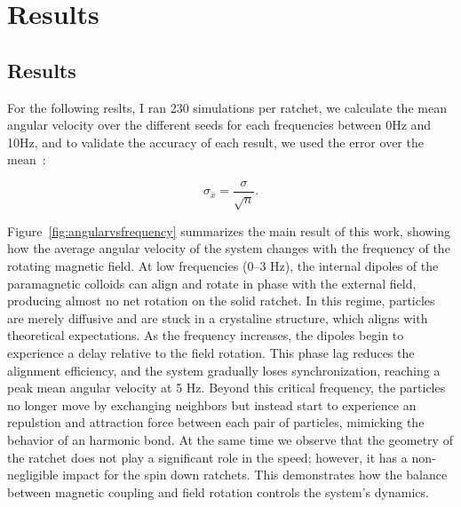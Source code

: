 \part{Results}
\label{part:results}

\chapter{Results}

For the following reslts, I ran 230 simulations per ratchet, we calculate the mean angular velocity over the different seeds for each frequencies between 0Hz and 10Hz, and to validate the accuracy of each result, we used the error over the mean~\cite{altman2005standard}:

\begin{equation}
  \sigma_{\bar{x}} = \displaystyle\frac{\sigma}{\sqrt{n}}.
  \label{eq:errormean}
\end{equation}

Figure~\ref{fig:angularvsfrequency} summarizes the main result of this work, showing how the average angular velocity of the system changes with the frequency of the rotating magnetic field. At low frequencies (0–3 Hz), the internal dipoles of the paramagnetic colloids can align and rotate in phase with the external field, producing almost no net rotation on the solid ratchet. In this regime, particles are merely diffusive and are stuck in a crystaline structure, which aligns with theoretical expectations.
As the frequency increases, the dipoles begin to experience a delay relative to the field rotation. This phase lag reduces the alignment efficiency, and the system gradually loses synchronization, reaching a peak mean angular velocity at 5 Hz. Beyond this critical frequency, the particles no longer move by exchanging neighbors but instead start to experience an repulstion and attraction force between each pair of particles, mimicking the behavior of an harmonic bond.
At the same time we observe that the geometry of the ratchet does not play a significant role in the speed; however, it has a non-negligible impact for the spin down ratchets.
This demonstrates how the balance between magnetic coupling and field rotation controls the system's dynamics. 

